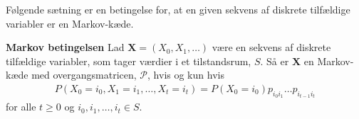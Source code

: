 Følgende sætning er en betingelse for, at en given sekvens af diskrete tilfældige variabler er en Markov-kæde.\\
\begin{minipage}\textwidth
\begin{thmx} \textbf{Markov betingelsen} \label{sæt:markov_tingtang}%
\newline 
Lad $\bm X=(X_0, X_1,\dots)$ være en sekvens af diskrete tilfældige variabler, som tager værdier i et tilstandsrum, $S$. Så er $\bm X$ en Markov-kæde med overgangsmatricen, $\mathcal{P}$, hvis og kun hvis
\begin{align}
    P(X_0=i_0,X_1=i_1,\dots, X_t=i_t)=P(X_0=i_0)p_{i_0i_1}\dots p_{i_{t-1}i_t}\label{markov-kæde-hovedsætning}
\end{align}
for alle $t\geq0$ og $i_0,i_1,\dots,i_t\in S$.
\end{thmx}
\end{minipage}
